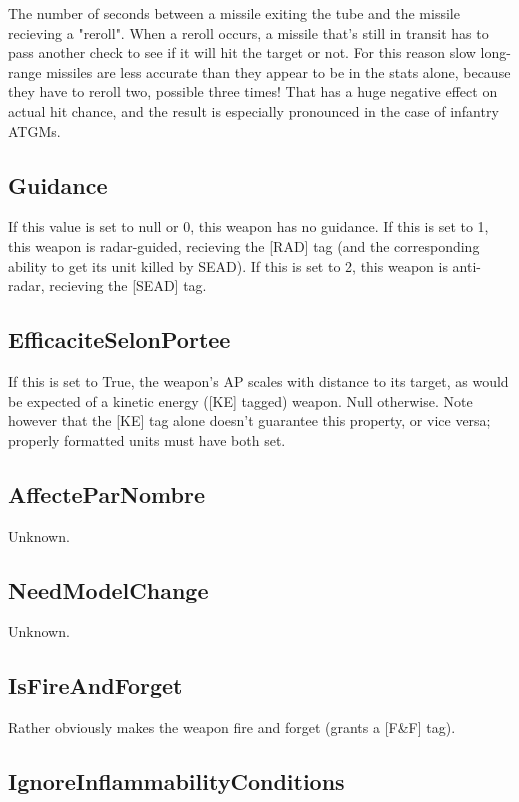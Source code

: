 \documentclass{article}
\begin{document}
The number of seconds between a missile exiting the tube and the missile recieving a "reroll". When a reroll occurs, a missile that's still in transit has to pass another check to see if it will hit the target or not. For this reason slow long-range missiles are less accurate than they appear to be in the stats alone, because they have to reroll two, possible three times! That has a huge negative effect on actual hit chance, and the result is especially pronounced in the case of infantry ATGMs.

\subsection{Guidance}

If this value is set to null or 0, this weapon has no guidance. If this is set to 1, this weapon is radar-guided, recieving the [RAD] tag (and the corresponding ability to get its unit killed by SEAD). If this is set to 2, this weapon is anti-radar, recieving the [SEAD] tag.

\subsection{EfficaciteSelonPortee}

If this is set to True, the weapon's AP scales with distance to its target, as would be expected of a kinetic energy ([KE] tagged) weapon. Null otherwise. Note however that the [KE] tag alone doesn't guarantee this property, or vice versa; properly formatted units must have both set.

\subsection{AffecteParNombre}

Unknown.

\subsection{NeedModelChange}

Unknown.

\subsection{IsFireAndForget}

Rather obviously makes the weapon fire and forget (grants a [F\&F] tag).

\subsection{IgnoreInflammabilityConditions}
\end{document}
